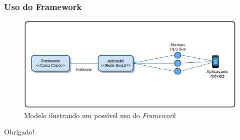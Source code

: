 \documentclass{beamer}
\begin{document}
\begin{frame}
\frametitle{Uso do Framework}

\begin{figure}[!h]
	\centering
	\includegraphics[scale=0.45]{../figuras/capitulo5/uso_proposto.eps}
	\caption{Modelo ilustrando um possível uso do \textit{Framework}}
	\label{uso_proposto}
\end{figure}

\end{frame}

\begin{frame}
\Huge{\centerline{Obrigado!}}
\end{frame}
\end{document}

